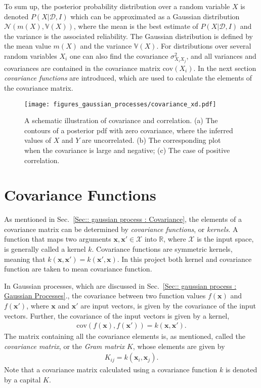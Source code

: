 \documentclass[twoside,english]{uiofysmaster}
\begin{document}
To sum up, the posterior probability distribution over a random variable $X$ is denoted $P(X | \mathcal{D}, I)$ which can be approximated as a Gaussian distribution $\mathcal{N}(m(X), \mathbb{V}(X))$, where the mean is the best estimate of $P(X | \mathcal{D}, I)$ and the variance is the associated reliability. The Gaussian distribution is defined by the mean value $m(X)$ and the variance $\mathbb{V}(X)$. For distributions over several random variables $X_i$ one can also find the covariance $\sigma_{X_i X_j}^2$, and all variances and covariances are contained in the covariance matrix $\text{cov}(X_i)$. In the next section \textit{covariance functions} are introduced, which are used to calculate the elements of the covariance matrix.

\begin{figure}
\centering
\texttt{[image: figures\_gaussian\_processes/covariance\_xd.pdf]}
\caption{A schematic illustration of covariance and correlation. (a) The contours of a posterior pdf with zero covariance, where the inferred values of $X$ and $Y$ are uncorrelated. (b) The corresponding plot when the covariance is large and negative; (c) The case of positive correlation.}
\label{Fig:: gaussian process : Covariance illustrated}
\end{figure}


\section{Covariance Functions}\label{Sec:: gaussian processes : Covariance functions}


As mentioned in Sec.~\ref{Sec:: gaussian process : Covariance}, the elements of a covariance matrix can be determined by \textit{covariance functions}, or \textit{kernels}. A function that maps two arguments $\textbf{x},\textbf{x}' \in \mathcal{X}$ into $\mathbb{R}$, where $\mathcal{X}$ is the input space, is generally called a kernel $k$. Covariance functions are symmetric kernels, meaning that $k(\textbf{x}, \textbf{x}') = k(\textbf{x}', \textbf{x})$. In this project both kernel and covariance function are taken to mean covariance function. 

In Gaussian processes, which are discussed in Sec.~\ref{Sec:: gaussian process : Gaussian Processes}., the covariance between two function values $f(\textbf{x})$ and $f(\textbf{x}')$, where $\textbf{x}$ and $\textbf{x}'$ are input vectors, is given by the covariance of the input vectors. Further, the covariance of the input vectors is given by a kernel, 
\begin{align}
\text{cov}(f(\textbf{x}), f(\textbf{x}')) = k(\textbf{x}, \textbf{x}').
\end{align}
The matrix containing all the covariance elements is, as mentioned, called the \textit{covariance matrix}, or the \textit{Gram matrix} $K$, whose elements are given by
\begin{align}\label{Eq:: covariance matrix}
K_{ij} = k(\textbf{x}_i, \textbf{x}_j).
\end{align}
Note that a covariance matrix calculated using a covariance function $k$ is denoted by a capital $K$.
\end{document}
